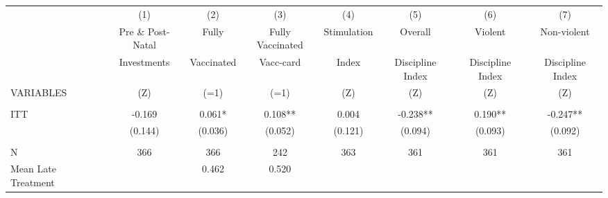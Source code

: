 \begin{tabular}{lccccccc} \hline
 & (1) & (2) & (3) & (4) & (5) & (6) & (7) \\
 & Pre \& Post-Natal & Fully & Fully Vaccinated & Stimulation & Overall & Violent & Non-violent \\
 & Investments & Vaccinated & Vacc-card & Index & Discipline Index & Discipline Index & Discipline Index \\
VARIABLES & (Z) & (=1) & (=1) & (Z) & (Z) & (Z) & (Z) \\ \hline
 &  &  &  &  &  &  &  \\
ITT & -0.169 & 0.061* & 0.108** & 0.004 & -0.238** & 0.190** & -0.247** \\
 & (0.144) & (0.036) & (0.052) & (0.121) & (0.094) & (0.093) & (0.092) \\
 &  &  &  &  &  &  &  \\
N & 366 & 366 & 242 & 363 & 361 & 361 & 361 \\
 Mean Late Treatment &  & 0.462 & 0.520 &  &  &  &  \\ \hline
\end{tabular}
